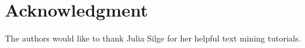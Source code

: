 \documentclass{svproc}
\begin{document}
\section*{Acknowledgment}
The authors would like to thank Julia Silge for her helpful text mining tutorials.





\end{document}
